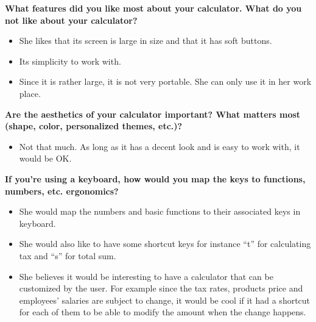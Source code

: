 \documentclass{article}
\begin{document}
\textbf{What features did you like most about your calculator. What do you not like about your calculator?}
\begin{itemize}
\itemsep0em 
\item She likes that its screen is large in size and that it has soft buttons.
\item Its simplicity to work with. 
\item Since it is rather large, it is not very portable. She can only use it in her work place.
\end{itemize}

\textbf{Are the aesthetics of your calculator important? What matters most (shape, color,  personalized themes, etc.)?}
\begin{itemize}
\itemsep0em 
\item Not that much. As long as it has a decent look and is easy to work with, it would be OK.
\end{itemize}

\textbf{If you’re using a keyboard, how would you map the keys to functions, numbers, etc. ergonomics?}
\begin{itemize}
\itemsep0em 
\item She would map the numbers and basic functions to their associated keys in keyboard.
\item She would also like to have some shortcut keys for instance “t” for calculating tax and “s” for total sum.
\item She believes it would be interesting to have a calculator that can be customized by the user. For example since the tax rates, products price and employees' salaries are subject to change, it would be cool if it had a shortcut for each of them to be able to modify the amount when the change happens. 
\end{itemize}
\pagebreak
\end{document}

